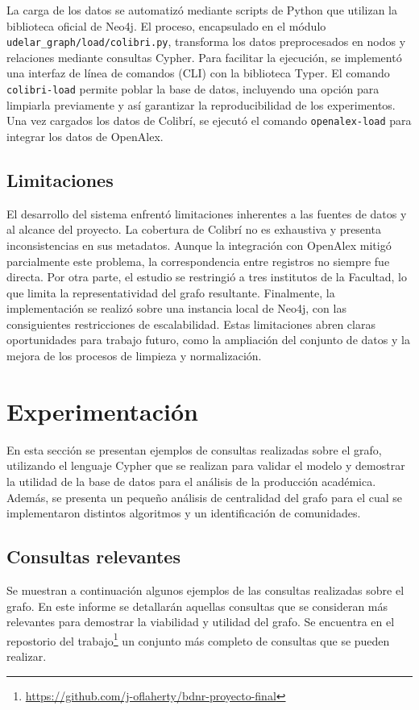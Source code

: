 \documentclass[journal]{IEEEtran}
\begin{document}
La carga de los datos se automatizó mediante scripts de Python que utilizan la biblioteca oficial de Neo4j. El proceso, encapsulado en el módulo \texttt{udelar\_graph/load/colibri.py}, transforma los datos preprocesados en nodos y relaciones mediante consultas Cypher. Para facilitar la ejecución, se implementó una interfaz de línea de comandos (CLI) con la biblioteca Typer. El comando \texttt{colibri-load} permite poblar la base de datos, incluyendo una opción para limpiarla previamente y así garantizar la reproducibilidad de los experimentos. Una vez cargados los datos de Colibrí, se ejecutó el comando \texttt{openalex-load} para integrar los datos de OpenAlex.

\subsection{Limitaciones}
El desarrollo del sistema enfrentó limitaciones inherentes a las fuentes de datos y al alcance del proyecto. La cobertura de Colibrí no es exhaustiva y presenta inconsistencias en sus metadatos. Aunque la integración con OpenAlex mitigó parcialmente este problema, la correspondencia entre registros no siempre fue directa. Por otra parte, el estudio se restringió a tres institutos de la Facultad, lo que limita la representatividad del grafo resultante. Finalmente, la implementación se realizó sobre una instancia local de Neo4j, con las consiguientes restricciones de escalabilidad. Estas limitaciones abren claras oportunidades para trabajo futuro, como la ampliación del conjunto de datos y la mejora de los procesos de limpieza y normalización.

\section{Experimentación}
\label{expe}
En esta sección se presentan ejemplos de consultas realizadas sobre el grafo, utilizando el lenguaje Cypher que se realizan para validar el modelo y demostrar la utilidad de la base de datos para el análisis de la producción académica. Además, se presenta un pequeño análisis de centralidad del grafo para el cual se implementaron distintos algoritmos y un identificación de comunidades.

\subsection{Consultas relevantes}
Se muestran a continuación algunos ejemplos de las consultas realizadas sobre el grafo. En este informe se detallarán aquellas consultas que se consideran más relevantes para demostrar la viabilidad y utilidad del grafo. Se encuentra en el repostorio del trabajo\footnote{\url{https://github.com/j-oflaherty/bdnr-proyecto-final}} un conjunto más completo de consultas que se pueden realizar.
\end{document}
